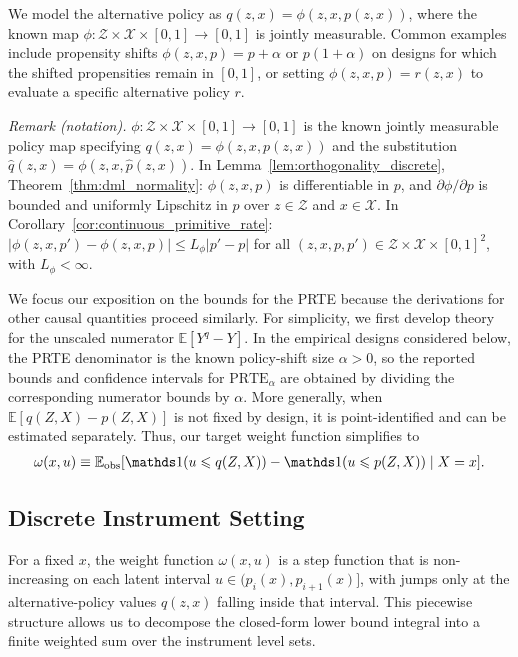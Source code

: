 We model the alternative policy as $q(z,x) = \phi(z,x,p(z,x))$, where the known map $\phi:\mathcal Z\times\mathcal X\times[0,1]\to[0,1]$ is jointly measurable. Common examples include propensity shifts $\phi(z,x,p) = p + \alpha$ or $p(1+\alpha)$ on designs for which the shifted propensities remain in $[0,1]$, or setting $\phi(z,x,p) = r(z,x)$ to evaluate a specific alternative policy $r$.

\noindent\textit{Remark (notation).} $\phi:\mathcal Z\times\mathcal X\times[0,1]\to[0,1]$ is the known jointly measurable policy map specifying $q(z,x)=\phi(z,x,p(z,x))$ and the substitution $\hat q(z,x)=\phi(z,x,\hat p(z,x))$. In Lemma~\ref{lem:orthogonality_discrete}, Theorem~\ref{thm:dml_normality}: $\phi(z,x,p)$ is differentiable in $p$, and $\partial\phi/\partial p$ is bounded and uniformly Lipschitz in $p$ over $z\in\mathcal Z$ and $x\in\mathcal X$. In Corollary~\ref{cor:continuous_primitive_rate}: $|\phi(z,x,p')-\phi(z,x,p)|\leqslant L_\phi|p'-p|$ for all $(z,x,p,p')\in\mathcal Z\times\mathcal X\times[0,1]^2$, with $L_\phi<\infty$.


We focus our exposition on the bounds for the PRTE because the derivations for other causal quantities proceed similarly. For simplicity, we first develop theory for the unscaled numerator $\mathbb{E}[Y^{q}-Y]$. In the empirical designs considered below, the PRTE denominator is the known policy-shift size $\alpha > 0$, so the reported bounds and confidence intervals for $\text{PRTE}_\alpha$ are obtained by dividing the corresponding numerator bounds by $\alpha$. More generally, when $\mathbb{E}[q(Z,X)-p(Z,X)]$ is not fixed by design, it is point-identified and can be estimated separately. Thus, our target weight function simplifies to
\begin{align*}
    \omega(x,u) \equiv \mathbb{E}_{\text{obs}}[\indicator(u \leqslant  q(Z,X)) -  \indicator(u \leqslant  p(Z,X)) \mid X=x].
\end{align*}

\subsection{Discrete Instrument Setting}

For a fixed $x$, the weight function $\omega(x,u)$ is a step function that is non-increasing on each latent interval $u \in (p_i(x), p_{i+1}(x)]$, with jumps only at the alternative-policy values $q(z,x)$ falling inside that interval. This piecewise structure allows us to decompose the closed-form lower bound integral into a finite weighted sum over the instrument level sets.

